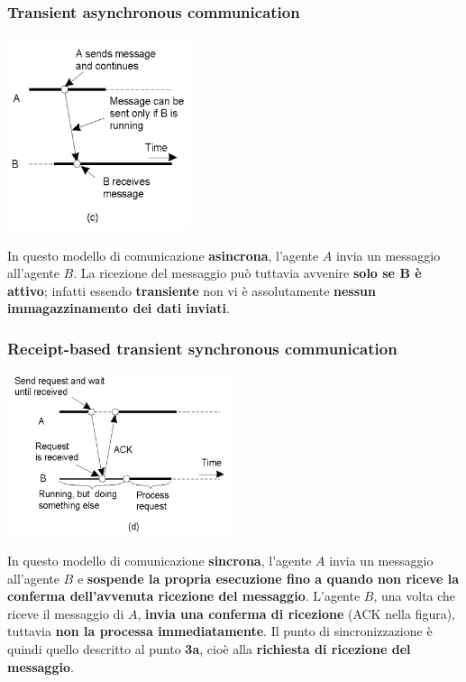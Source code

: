 \documentclass[12pt]{article}
\begin{document}
\subsubsection{Transient asynchronous communication}
\begin{center}
    \includegraphics[width = 0.40\textwidth]{Images/133.PNG}
\end{center}
In questo modello di comunicazione \textbf{asincrona}, l'agente $A$ invia un messaggio all'agente $B$. La ricezione del messaggio può tuttavia avvenire \textbf{solo se $\textbf{B}$ è attivo}; infatti essendo \textbf{transiente} non vi è assolutamente \textbf{nessun immagazzinamento dei dati inviati}.
\subsubsection{Receipt-based transient synchronous communication}
\begin{center}
    \includegraphics[width = 0.50\textwidth]{Images/134.PNG}
\end{center}
In questo modello di comunicazione \textbf{sincrona}, l'agente $A$ invia un messaggio all'agente $B$ e \textbf{sospende la propria esecuzione fino a quando non riceve la conferma dell'avvenuta ricezione del messaggio}. L'agente $B$, una volta che riceve il messaggio di $A$, \textbf{invia una conferma di ricezione} (ACK nella figura), tuttavia \textbf{non la processa immediatamente}. Il punto di sincronizzazione è quindi quello descritto al punto \textbf{3a}, cioè alla \textbf{richiesta di ricezione del messaggio}.
\newpage
\end{document}
